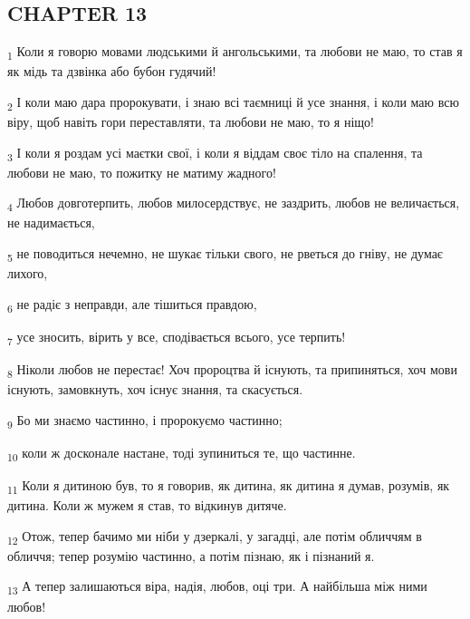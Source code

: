 \subsection{CHAPTER 13}
\begin{tcolorbox}
\textsubscript{1} Коли я говорю мовами людськими й ангольськими, та любови не маю, то став я як мідь та дзвінка або бубон гудячий!
\end{tcolorbox}
\begin{tcolorbox}
\textsubscript{2} І коли маю дара пророкувати, і знаю всі таємниці й усе знання, і коли маю всю віру, щоб навіть гори переставляти, та любови не маю, то я ніщо!
\end{tcolorbox}
\begin{tcolorbox}
\textsubscript{3} І коли я роздам усі маєтки свої, і коли я віддам своє тіло на спалення, та любови не маю, то пожитку не матиму жадного!
\end{tcolorbox}
\begin{tcolorbox}
\textsubscript{4} Любов довготерпить, любов милосердствує, не заздрить, любов не величається, не надимається,
\end{tcolorbox}
\begin{tcolorbox}
\textsubscript{5} не поводиться нечемно, не шукає тільки свого, не рветься до гніву, не думає лихого,
\end{tcolorbox}
\begin{tcolorbox}
\textsubscript{6} не радіє з неправди, але тішиться правдою,
\end{tcolorbox}
\begin{tcolorbox}
\textsubscript{7} усе зносить, вірить у все, сподівається всього, усе терпить!
\end{tcolorbox}
\begin{tcolorbox}
\textsubscript{8} Ніколи любов не перестає! Хоч пророцтва й існують, та припиняться, хоч мови існують, замовкнуть, хоч існує знання, та скасується.
\end{tcolorbox}
\begin{tcolorbox}
\textsubscript{9} Бо ми знаємо частинно, і пророкуємо частинно;
\end{tcolorbox}
\begin{tcolorbox}
\textsubscript{10} коли ж досконале настане, тоді зупиниться те, що частинне.
\end{tcolorbox}
\begin{tcolorbox}
\textsubscript{11} Коли я дитиною був, то я говорив, як дитина, як дитина я думав, розумів, як дитина. Коли ж мужем я став, то відкинув дитяче.
\end{tcolorbox}
\begin{tcolorbox}
\textsubscript{12} Отож, тепер бачимо ми ніби у дзеркалі, у загадці, але потім обличчям в обличчя; тепер розумію частинно, а потім пізнаю, як і пізнаний я.
\end{tcolorbox}
\begin{tcolorbox}
\textsubscript{13} А тепер залишаються віра, надія, любов, оці три. А найбільша між ними любов!
\end{tcolorbox}

